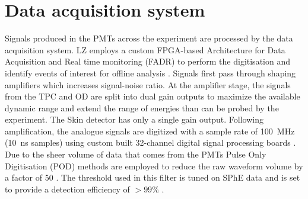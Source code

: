 \section{Data acquisition system}\label{sec:LZ/LZDAQ}
Signals produced in the PMTs across the experiment are processed by the data acquisition system. LZ employs a custom FPGA-based Architecture for Data Acquisition and Real time monitoring (FADR) to perform the digitisation and identify events of interest for offline analysis \cite{LZ:2024bvw,Druszkiewicz:2015pcl}. 
Signals first pass through shaping amplifiers which increases signal-noise ratio. At the amplifier stage, the signals from the TPC and OD are split into dual gain outputs to maximize the available dynamic range and extend the range of energies than can be probed by the experiment. The Skin detector has only a single gain output. Following amplification, the analogue signals are digitized with a sample rate of 100~MHz (10~ns samples) using custom built 32-channel digital signal processing boards \cite{Druszkiewicz:2015pcl}. Due to the sheer volume of data that comes from the PMTs Pulse Only Digitisation (POD) methods are employed to reduce the raw waveform volume by a factor of 50 \cite{LZTDR}. The threshold used in this filter is tuned on SPhE data and is set to provide a detection efficiency of $>99\%$ \cite{LZ:2024bvw}. 

